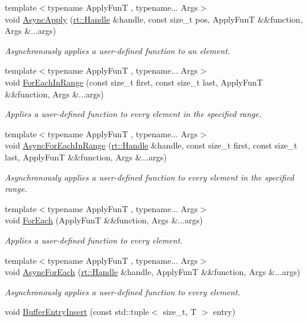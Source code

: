 \begin{DoxyCompactItemize}
{\footnotesize template$<$typename Apply\-Fun\-T , typename... Args$>$ }\\void \hyperlink{classshad_1_1Array_a7761587f45d0059212091ba33366e4e6}{Async\-Apply} (\hyperlink{classshad_1_1rt_1_1Handle}{rt\-::\-Handle} \&handle, const size\-\_\-t pos, Apply\-Fun\-T \&\&function, Args \&...args)
\begin{DoxyCompactList}\small\item\em Asynchronously applies a user-\/defined function to an element. \end{DoxyCompactList}\item 
{\footnotesize template$<$typename Apply\-Fun\-T , typename... Args$>$ }\\void \hyperlink{classshad_1_1Array_a5136714d22b0efef01f6711e2ad2a8fc}{For\-Each\-In\-Range} (const size\-\_\-t first, const size\-\_\-t last, Apply\-Fun\-T \&\&function, Args \&...args)
\begin{DoxyCompactList}\small\item\em Applies a user-\/defined function to every element in the specified range. \end{DoxyCompactList}\item 
{\footnotesize template$<$typename Apply\-Fun\-T , typename... Args$>$ }\\void \hyperlink{classshad_1_1Array_a993d7eb96221277f74c6fb4c36f36f8e}{Async\-For\-Each\-In\-Range} (\hyperlink{classshad_1_1rt_1_1Handle}{rt\-::\-Handle} \&handle, const size\-\_\-t first, const size\-\_\-t last, Apply\-Fun\-T \&\&function, Args \&...args)
\begin{DoxyCompactList}\small\item\em Asynchronously applies a user-\/defined function to every element in the specified range. \end{DoxyCompactList}\item 
{\footnotesize template$<$typename Apply\-Fun\-T , typename... Args$>$ }\\void \hyperlink{classshad_1_1Array_a6fd05a7fd2e8ef73ed288f5c1bfcf171}{For\-Each} (Apply\-Fun\-T \&\&function, Args \&...args)
\begin{DoxyCompactList}\small\item\em Applies a user-\/defined function to every element. \end{DoxyCompactList}\item 
{\footnotesize template$<$typename Apply\-Fun\-T , typename... Args$>$ }\\void \hyperlink{classshad_1_1Array_a076303cbecce5e29fadd0a4333428efa}{Async\-For\-Each} (\hyperlink{classshad_1_1rt_1_1Handle}{rt\-::\-Handle} \&handle, Apply\-Fun\-T \&\&function, Args \&...args)
\begin{DoxyCompactList}\small\item\em Asynchronously applies a user-\/defined function to every element. \end{DoxyCompactList}\item 
void \hyperlink{classshad_1_1Array_a98bd6440ea4037335356cd6cc95a0cde}{Buffer\-Entry\-Insert} (const std\-::tuple$<$ size\-\_\-t, T $>$ entry)
\end{DoxyCompactItemize}
